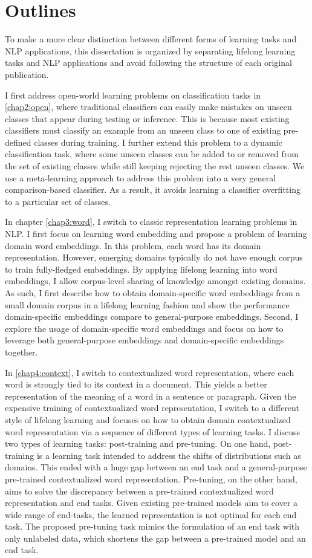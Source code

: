 \section{Outlines}
To make a more clear distinction between different forms of learning tasks and NLP applications, this dissertation is organized by separating lifelong learning tasks and NLP applications and avoid following the structure of each original publication.


I first address open-world learning problems on classification tasks in \ref{chap2:open}, where traditional classifiers can easily make mistakes on unseen classes that appear during testing or inference. 
This is because most existing classifiers must classify an example from an unseen class to one of existing pre-defined classes during training. 
I further extend this problem to a dynamic classification task, where some unseen classes can be added to or removed from the set of existing classes while still keeping rejecting the rest unseen classes. We use a meta-learning approach to address this problem into a very general comparison-based classifier.
As a result, it avoids learning a classifier overfitting to a particular set of classes.

In chapter \ref{chap3:word}, I switch to classic representation learning problems in NLP.
I first focus on learning word embedding and propose a problem of learning domain word embeddings.
In this problem, each word has its domain representation.
However, emerging domains typically do not have enough corpus to train fully-fledged embeddings.
By applying lifelong learning into word embeddings, I allow corpus-level sharing of knowledge amongst existing domains. 
As such, I first describe how to obtain domain-specific word embeddings from a small domain corpus in a lifelong learning fashion and show the performance domain-specific embeddings compare to general-purpose embeddings.
Second, I explore the usage of domain-specific word embeddings and focus on how to leverage both general-purpose embeddings and domain-specific embeddings together.

In \ref{chap4:context}, I switch to contextualized word representation, where each word is strongly tied to its context in a document.
This yields a better representation of the meaning of a word in a sentence or paragraph.
Given the expensive training of contextualized word representation, I switch to a different style of lifelong learning and focuses on how to obtain domain contextualized word representation via a sequence of different types of learning tasks.
I discuss two types of learning tasks: post-training and pre-tuning.
On one hand, post-training is a learning task intended to address the shifts of distributions such as domains.
This ended with a huge gap between an end task and a general-purpose pre-trained contextualized word representation. 
Pre-tuning, on the other hand, aims to solve the discrepancy between a pre-trained contextualized word representation and end tasks.
Given existing pre-trained models aim to cover a wide range of end-tasks, the learned representation is not optimal for each end task.
The proposed pre-tuning task mimics the formulation of an end task with only unlabeled data, which shortens the gap between a pre-trained model and an end task.

